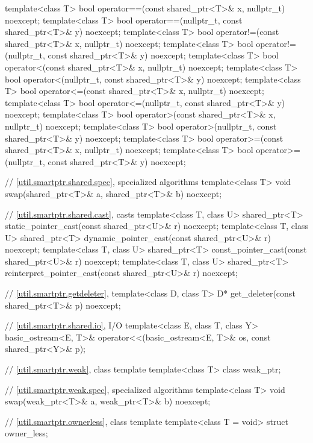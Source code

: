 \begin{codeblock}
{  template<class T>
    bool operator==(const shared_ptr<T>& x, nullptr_t) noexcept;
  template<class T>
    bool operator==(nullptr_t, const shared_ptr<T>& y) noexcept;
  template<class T>
    bool operator!=(const shared_ptr<T>& x, nullptr_t) noexcept;
  template<class T>
    bool operator!=(nullptr_t, const shared_ptr<T>& y) noexcept;
  template<class T>
    bool operator<(const shared_ptr<T>& x, nullptr_t) noexcept;
  template<class T>
    bool operator<(nullptr_t, const shared_ptr<T>& y) noexcept;
  template<class T>
    bool operator<=(const shared_ptr<T>& x, nullptr_t) noexcept;
  template<class T>
    bool operator<=(nullptr_t, const shared_ptr<T>& y) noexcept;
  template<class T>
    bool operator>(const shared_ptr<T>& x, nullptr_t) noexcept;
  template<class T>
    bool operator>(nullptr_t, const shared_ptr<T>& y) noexcept;
  template<class T>
    bool operator>=(const shared_ptr<T>& x, nullptr_t) noexcept;
  template<class T>
    bool operator>=(nullptr_t, const shared_ptr<T>& y) noexcept;

  // \ref{util.smartptr.shared.spec},  specialized algorithms
  template<class T>
    void swap(shared_ptr<T>& a, shared_ptr<T>& b) noexcept;

  // \ref{util.smartptr.shared.cast},  casts
  template<class T, class U>
    shared_ptr<T> static_pointer_cast(const shared_ptr<U>& r) noexcept;
  template<class T, class U>
    shared_ptr<T> dynamic_pointer_cast(const shared_ptr<U>& r) noexcept;
  template<class T, class U>
    shared_ptr<T> const_pointer_cast(const shared_ptr<U>& r) noexcept;
  template<class T, class U>
    shared_ptr<T> reinterpret_pointer_cast(const shared_ptr<U>& r) noexcept;

  // \ref{util.smartptr.getdeleter},  
  template<class D, class T>
    D* get_deleter(const shared_ptr<T>& p) noexcept;

  // \ref{util.smartptr.shared.io},  I/O
  template<class E, class T, class Y>
    basic_ostream<E, T>& operator<<(basic_ostream<E, T>& os, const shared_ptr<Y>& p);

  // \ref{util.smartptr.weak}, class template 
  template<class T> class weak_ptr;

  // \ref{util.smartptr.weak.spec},  specialized algorithms
  template<class T> void swap(weak_ptr<T>& a, weak_ptr<T>& b) noexcept;

  // \ref{util.smartptr.ownerless}, class template 
  template<class T = void> struct owner_less;

}
\end{codeblock}
